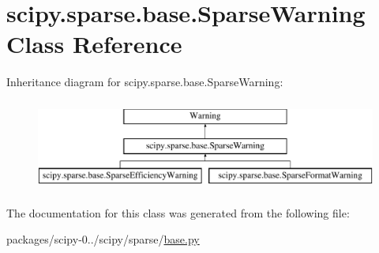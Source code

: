 \hypertarget{classscipy_1_1sparse_1_1base_1_1SparseWarning}{}\section{scipy.\+sparse.\+base.\+Sparse\+Warning Class Reference}
\label{classscipy_1_1sparse_1_1base_1_1SparseWarning}
Inheritance diagram for scipy.\+sparse.\+base.\+Sparse\+Warning\+:\begin{figure}[H]
\begin{center}
\leavevmode
\includegraphics[height=3.000000cm]{classscipy_1_1sparse_1_1base_1_1SparseWarning}
\end{center}
\end{figure}


The documentation for this class was generated from the following file\+:\begin{DoxyCompactItemize}
\item 
packages/scipy-\/0../scipy/sparse/\hyperlink{base_8py}{base.\+py}\end{DoxyCompactItemize}
